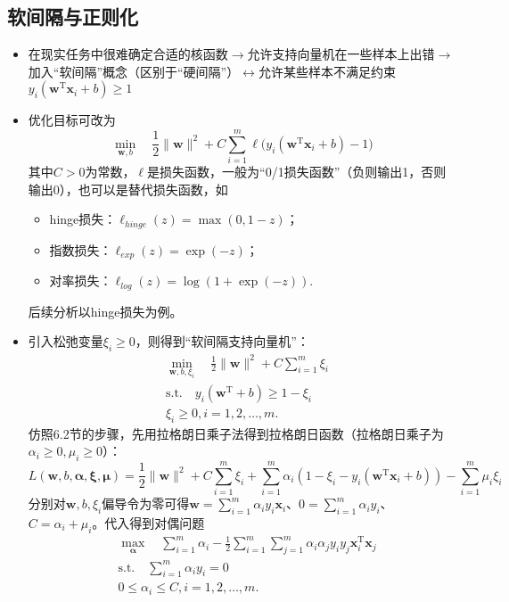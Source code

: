 \documentclass{ctexart}
\begin{document}
				\subsection{软间隔与正则化}
					\begin{itemize}
						\item 在现实任务中很难确定合适的核函数$\rightarrow$允许支持向量机在一些样本上出错$\rightarrow$加入``软间隔''概念（区别于``硬间隔''）$\leftrightarrow$允许某些样本不满足约束$y_i(\bm{w}^{\mathrm{T}}\bm{x}_i+b)\ge1$
						\item 优化目标可改为\[\min\limits_{\bm{w},b}\quad\frac{1}{2}\parallel\bm{w}\parallel^2+C\sum_{i=1}^{m}\ell\big(y_i(\bm{w}^{\mathrm{T}}\bm{x}_i+b)-1\big)\]其中$C>0$为常数，$\ell$是损失函数，一般为``0/1损失函数''（负则输出1，否则输出0），也可以是替代损失函数，如\begin{itemize}
							\item hinge损失：$\ell_{hinge}(z)=\max(0, 1-z)$；
							\item 指数损失：$\ell_{exp}(z)=\exp(-z)$；
							\item 对率损失：$\ell_{log}(z)=\log(1+\exp(-z)).$
						\end{itemize}
						后续分析以hinge损失为例。
						\item 引入松弛变量$\xi_i\ge0$，则得到``软间隔支持向量机''：\begin{align*}
							& \min\limits_{\bm{w},b,\xi_i}\quad\frac{1}{2}\parallel\bm{w}\parallel^2+C\sum_{i=1}^{m}\xi_i \\
							& \mathrm{s.t.}\quad y_i(\bm{w}^{\mathrm{T}}+b)\ge1-\xi_i\\
							& \xi_i\ge0,i=1,2,\dots,m.
						\end{align*}
						仿照6.2节的步骤，先用拉格朗日乘子法得到拉格朗日函数（拉格朗日乘子为$\alpha_i\ge0,\mu_i\ge0$）：\[L(\bm{w},b,\bm{\alpha},\bm{\xi},\bm{\mu})=\frac{1}{2}\parallel\bm{w}\parallel^2+C\sum_{i=1}^{m}\xi_i+\sum_{i=1}^{m}\alpha_i(1-\xi_i-y_i(\bm{w}^{\mathrm{T}}\bm{x}_i+b))-\sum_{i=1}^{m}\mu_i\xi_i\]分别对$\bm{w},b,\xi_i$偏导令为零可得$\bm{w}=\sum_{i=1}^{m}\alpha_iy_i\bm{x}_i$、$0=\sum_{i=1}^{m}\alpha_iy_i$、$C=\alpha_i+\mu_i$。代入得到对偶问题\begin{align*}
							& \max\limits_{\bm{\alpha}}\quad\sum_{i=1}^{m}\alpha_i-\frac{1}{2}\sum_{i=1}^{m}\sum_{j=1}^{m}\alpha_i\alpha_jy_iy_j\bm{x}_i^{\mathrm{T}}\bm{x}_j\\
							& \mathrm{s.t.}\quad\sum_{i=1}^{m}\alpha_iy_i=0\\
							& 0\le\alpha_i\le C,i=1,2,\dots,m.
						\end{align*}

\end{itemize}
\end{document}
